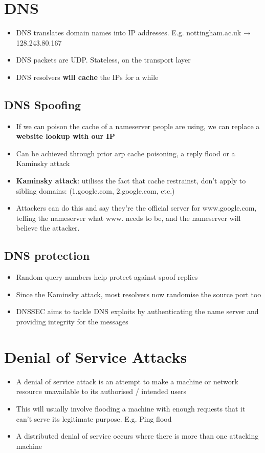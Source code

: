 \documentclass{article}
\begin{document}
\section{DNS}
\begin{itemize}
  \item DNS translates domain names into IP addresses. E.g. nottingham.ac.uk → 128.243.80.167 
  \item DNS packets are UDP. Stateless, on the transport layer 
  \item DNS resolvers \textbf{will cache} the IPs for a while
\end{itemize}

\subsection{DNS Spoofing}
\begin{itemize}
  \item If we can poison the cache of a nameserver people are using, we can replace a \textbf{website lookup with our IP}
  \item Can be achieved through prior arp cache poisoning, a reply flood or a Kaminsky attack
  \item \textbf{Kaminsky attack}: utilises the fact that cache restrainst, don't apply to sibling domains: (1.google.com, 2.google.com, etc.)
  \item Attackers can do this and say they’re the official server for www.google.com, telling the nameserver what www. needs to be, and the nameserver will believe the attacker.
\end{itemize}

\subsection{DNS protection}
\begin{itemize}
  \item Random query numbers help protect against spoof replies 
  \item Since the Kaminsky attack, most resolvers now randomise the source port too 
  \item DNSSEC aims to tackle DNS exploits by authenticating the name server and providing integrity for the messages
\end{itemize}

\section{Denial of Service Attacks}
\begin{itemize}
  \item A denial of service attack is an attempt to make a machine or network resource unavailable to its authorised / intended users 
  \item This will usually involve flooding a machine with enough requests that it can’t serve its legitimate purpose. E.g. Ping flood 
  \item A distributed denial of service occurs where there is more than one attacking machine
\end{itemize}
\end{document}
